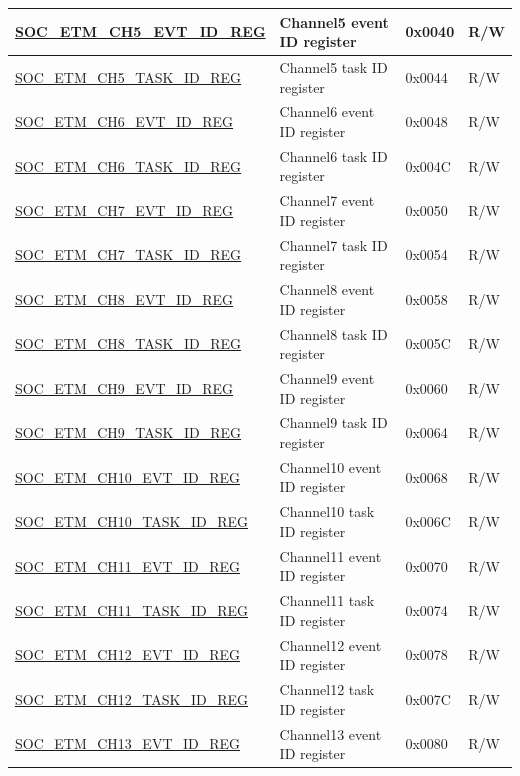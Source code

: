\begin{longtable}{ | p{6cm} | p{6.4cm} | p{1.3cm} | p{1.8cm} | }
\hyperref[regdesc:SOCETMCH0EVTIDREG]{SOC\_ETM\_CH5\_EVT\_ID\_REG} & Channel5 event ID register & 0x0040 & R/W \\ \hline
\hyperref[regdesc:SOCETMCH0TASKIDREG]{SOC\_ETM\_CH5\_TASK\_ID\_REG} & Channel5 task ID register & 0x0044 & R/W \\ \hline
\hyperref[regdesc:SOCETMCH0EVTIDREG]{SOC\_ETM\_CH6\_EVT\_ID\_REG} & Channel6 event ID register & 0x0048 & R/W \\ \hline
\hyperref[regdesc:SOCETMCH0TASKIDREG]{SOC\_ETM\_CH6\_TASK\_ID\_REG} & Channel6 task ID register & 0x004C & R/W \\ \hline
\hyperref[regdesc:SOCETMCH0EVTIDREG]{SOC\_ETM\_CH7\_EVT\_ID\_REG} & Channel7 event ID register & 0x0050 & R/W \\ \hline
\hyperref[regdesc:SOCETMCH0TASKIDREG]{SOC\_ETM\_CH7\_TASK\_ID\_REG} & Channel7 task ID register & 0x0054 & R/W \\ \hline
\hyperref[regdesc:SOCETMCH0EVTIDREG]{SOC\_ETM\_CH8\_EVT\_ID\_REG} & Channel8 event ID register & 0x0058 & R/W \\ \hline
\hyperref[regdesc:SOCETMCH0TASKIDREG]{SOC\_ETM\_CH8\_TASK\_ID\_REG} & Channel8 task ID register & 0x005C & R/W \\ \hline
\hyperref[regdesc:SOCETMCH0EVTIDREG]{SOC\_ETM\_CH9\_EVT\_ID\_REG} & Channel9 event ID register & 0x0060 & R/W \\ \hline
\hyperref[regdesc:SOCETMCH0TASKIDREG]{SOC\_ETM\_CH9\_TASK\_ID\_REG} & Channel9 task ID register & 0x0064 & R/W \\ \hline
\hyperref[regdesc:SOCETMCH0EVTIDREG]{SOC\_ETM\_CH10\_EVT\_ID\_REG} & Channel10 event ID register & 0x0068 & R/W \\ \hline
\hyperref[regdesc:SOCETMCH0TASKIDREG]{SOC\_ETM\_CH10\_TASK\_ID\_REG} & Channel10 task ID register & 0x006C & R/W \\ \hline
\hyperref[regdesc:SOCETMCH0EVTIDREG]{SOC\_ETM\_CH11\_EVT\_ID\_REG} & Channel11 event ID register & 0x0070 & R/W \\ \hline
\hyperref[regdesc:SOCETMCH0TASKIDREG]{SOC\_ETM\_CH11\_TASK\_ID\_REG} & Channel11 task ID register & 0x0074 & R/W \\ \hline
\hyperref[regdesc:SOCETMCH0EVTIDREG]{SOC\_ETM\_CH12\_EVT\_ID\_REG} & Channel12 event ID register & 0x0078 & R/W \\ \hline
\hyperref[regdesc:SOCETMCH0TASKIDREG]{SOC\_ETM\_CH12\_TASK\_ID\_REG} & Channel12 task ID register & 0x007C & R/W \\ \hline
\hyperref[regdesc:SOCETMCH0EVTIDREG]{SOC\_ETM\_CH13\_EVT\_ID\_REG} & Channel13 event ID register & 0x0080 & R/W \\ \hline

\end{longtable}
